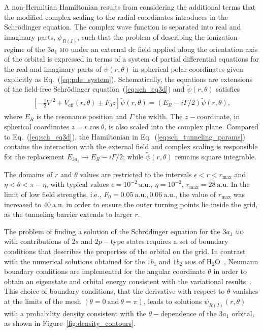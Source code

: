 A non-Hermitian Hamiltonian results from considering the additional
terms that the modified complex scaling to the radial coordinates
introduces in the Schr\"{o}dinger equation. The complex wave function
is separated into real and imaginary parts, $\psi_{R(I)}$, such that
the problem of describing the ionization regime of the $3a_{1}$
\textsc{mo} under an external dc field applied along the orientation
axis of the orbital is expressed in terms of a system of partial
differential equations for the real and imaginary parts of
$\widetilde{\psi}(r,\theta)$ in spherical polar coordinates given
explicitly as Eq.~(\ref{eq:pde_system}). Schematically, the equations
are extensions of the field-free Schr\"{o}dinger
equation~(\ref{eq:sch_eq3d}) and $\widetilde{\psi}(r,\theta)$
satisfies~\cite{sarias_2017}
%
\begin{eqnarray}
  \begin{split}
    \left[ -\frac{1}{2}\nabla^{2} + V_{\mathrm{eff}}(r, \theta)
      \pm F_{0}z \right] \widetilde{\psi}(r,\theta) = (E_{R} - i\Gamma/2)
    \widetilde{\psi}(r, \theta),
  \end{split}
  \label{eq:sch_tunneling_params}
\end{eqnarray}
%
where $E_{R}$ is the resonance position and $\Gamma$ the width. The
$z-$coordinate, in spherical coordinates $z = r\cos\theta$, is also
scaled into the complex plane. Compared to Eq.~(\ref{eq:sch_eq3d}),
the Hamiltonian in Eq.~(\ref{eq:sch_tunneling_params}) contains the
interaction with the external field and complex scaling is responsible
for the replacement $E_{3a_{1}} \to E_{R} - i\Gamma/2$; while
$\widetilde{\psi}(r, \theta)$ remains square integrable.

The domains of $r$ and $\theta$ values are restricted to the intervals
$\epsilon < r < r_{\mathrm{max}}$ and $\eta < \theta < \pi - \eta$,
with typical values $\epsilon = 10^{-2}\ \mathrm{a.u.}$, $\eta =
10^{-2}$, $r_{\mathrm{max}} = 28\ \mathrm{a.u.}$ In the limit of low
field strengths, i.e., $F_{0} = 0.05\ \mathrm{a.u.},
0.06\ \mathrm{a.u.}$, the value of $r_{\mathrm{max}}$ was increased to
$40\ \mathrm{a.u.}$ in order to ensure the outer turning points lie
inside the grid, as the tunneling barrier extends to larger $r$.

The problem of finding a solution of the Schr\"{o}dinger equation for
the $3a_{1}$ \textsc{mo} with contributions of $2s$ and $2p-$type
states requires a set of boundary conditions that describes the
properties of the orbital on the grid. In contrast with the numerical
solutions obtained for the $1b_{1}$ and $1b_{2}$ \textsc{mo}s of
H$_{2}$O~\cite{sarias_2016}, Neumann boundary conditions are
implemented for the angular coordinate $\theta$ in order to obtain an
eigenstate and orbital energy consistent with the variational
results~\cite{Moccia_1964}. This choice of boundary conditions, that
the derivative with respect to $\theta$ vanishes at the limits of the
mesh $(\theta = 0 ~\mathrm{and}~ \theta = \pi)$, leads to solutions
$\psi_{R(I)}(r,\theta)$ with a probability density consistent with the
$\theta-$dependence of the $3a_{1}$ orbital, as shown in
Figure~\ref{fig:density_contours}.



